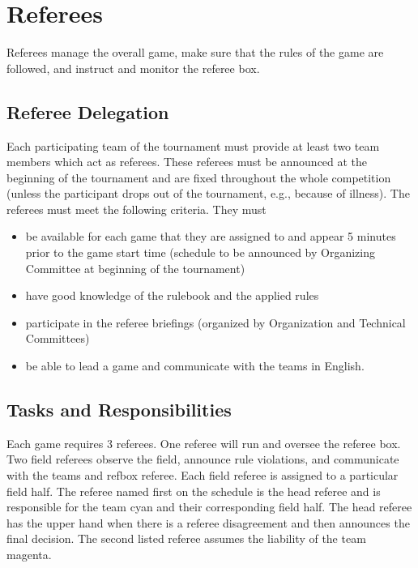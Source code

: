 \documentclass[12pt,twoside]{article}
\begin{document}

\section{Referees}
Referees manage the overall game, make sure that the rules of the game
are followed, and instruct and monitor the referee box.

\subsection{Referee Delegation}
Each participating team of the tournament must provide at least two
team members which act as referees. These referees must be announced
at the beginning of the tournament and are fixed throughout the whole
competition (unless the participant drops out of the tournament,
e.g., because of illness). The referees must meet the following
criteria. They must

\begin{itemize}
\item be available for each game that they are assigned to and appear
  5 minutes prior to the game start time (schedule to be announced by
  Organizing Committee at beginning of the tournament)
\item have good knowledge of the rulebook and the applied rules
\item participate in the referee briefings (organized by Organization
  and Technical Committees)
\item be able to lead a game and communicate with the teams in
  English.
\end{itemize}

\subsection{Tasks and Responsibilities}
Each game requires 3 referees. One referee will run and oversee the
referee box. Two field referees observe the field, announce rule
violations, and communicate with the teams and refbox referee. Each
field referee is assigned to a particular field half. The referee
named first on the schedule is the head referee and is responsible for the
team cyan and their corresponding field half. The head referee has
the upper hand when there is a referee disagreement and then announces
the final decision. The second listed referee assumes the liability of the
team magenta.
\end{document}
